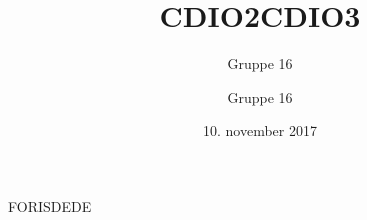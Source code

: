 \documentclass[12pt,a4paper]{article}
\title{CDIO2}
\author{Gruppe 16}
\date{10. november 2017}
\author{Gruppe 16}
\title{CDIO3}
\begin{document}
    FORISDEDE
        \pagebreak
        \pagebreak
        \pagebreak
        \pagebreak
    
\end{document}
